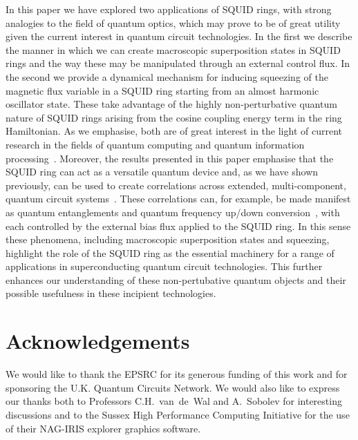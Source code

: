 \documentclass[12pt,a4paper,superscriptaddress,showpacs,floatfix,pra]{revtex4-2}
\begin{document}
In this paper  we have explored two applications  of SQUID rings, with
strong analogies to the field of quantum optics, which may prove to be
of  great  utility  given  the  current interest  in  quantum  circuit
technologies.  In the first  we describe  the manner  in which  we can
create  macroscopic superposition states  in SQUID  rings and  the way
these  may be  manipulated through  an external  control flux.  In the
second we provide a dynamical  mechanism for inducing squeezing of the
magnetic  flux  variable in  a  SQUID  ring  starting from  an  almost
harmonic  oscillator  state.  These   take  advantage  of  the  highly
non-perturbative quantum nature of SQUID rings arising from the cosine
coupling energy  term in the  ring Hamiltonian. As we  emphasise, both
are of great  interest in the light of current  research in the fields
of      quantum       computing      and      quantum      information
processing~\cite{lo_hk_1998,OrlandoMTvLLM99,MakhlinSS99,AverinNO90}. Moreover,
the results presented in this  paper emphasise that the SQUID ring can
act as  a versatile quantum device  and, as we  have shown previously,
can be  used to create correlations  across extended, multi-component,
quantum                                                         circuit
systems~\cite{EverittSCVRPP01,EverittCSPPVR01,Migliore2003a,Migliore2003b,Almaas2002,Saidi2002}. These
correlations   can,  for   example,  be   made  manifest   as  quantum
entanglements        and        quantum       frequency        up/down
conversion~\cite{EverittSCVRPP01,EverittCSPPVR01},      with      each
controlled by  the external  bias flux applied  to the SQUID  ring. In
this sense these phenomena, including macroscopic superposition states
and squeezing, highlight  the role of the SQUID  ring as the essential
machinery  for  a range  of  applications  in superconducting  quantum
circuit technologies. This further enhances our understanding of these
non-pertubative quantum objects and their possible usefulness in these
incipient technologies.

\section{Acknowledgements}

We would like to thank the EPSRC for its generous funding of this work
and for  sponsoring the U.K.  Quantum Circuits Network. We  would also
like  to express  our thanks  both to  Professors  C.H.~van~de~Wal and
A.~Sobolev  for  interesting  discussions   and  to  the  Sussex  High
Performance  Computing  Initiative  for  the  use  of  their  NAG-IRIS
explorer graphics software.



\end{document}
